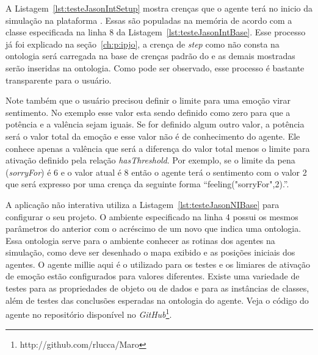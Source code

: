 A Listagem~\ref{lst:testeJasonIntSetup} mostra crenças que o agente terá
no inicio da simulação na plataforma \jason. Essas são populadas na memória
de acordo com a classe especificada na linha 8 da
Listagem~\ref{lst:testeJasonIntBase}. Esse processo já foi explicado na
seção~\ref{ch:p:ipjo}, a crença de \emph{step} como não
consta na ontologia será carregada na base de crenças padrão do \jason e as
demais mostradas serão inseridas na ontologia. Como pode ser observado, esse
processo é bastante transparente para o usuário.

Note também que o usuário precisou definir o limite para uma emoção virar
sentimento. No exemplo esse valor esta sendo definido como zero para que a
potência e a valência sejam iguais. Se for definido algum outro valor, a
potência será o valor total da emoção e esse valor não é de conhecimento do
agente. Ele conhece apenas a valência que será a diferença do valor total
menos o limite para ativação definido pela relação \emph{hasThreshold}. Por
exemplo, se o limite da pena (\emph{sorryFor}) é 6 e o valor atual é 8 então o
agente terá o sentimento com o valor 2 que será expresso por uma crença da
seguinte forma ``feeling("sorryFor",2).''.


\begin{center}
    \begin{minipage}{140mm}
	\lstset{linewidth=140mm}
	
    \end{minipage}
\end{center}

A aplicação não interativa utiliza a Listagem~\ref{lst:testeJasonNIBase} para
configurar o seu projeto. O ambiente especificado na linha 4 possui os mesmos
parâmetros do anterior com o acréscimo de um novo que indica uma ontologia.
Essa ontologia serve para o ambiente conhecer as rotinas dos agentes na
simulação, como deve ser desenhado o mapa exibido e as posições iniciais dos
agentes. O agente millie aqui é o utilizado para os testes e os limiares de
ativação de emoção estão configurados para valores diferentes. Existe uma
variedade de testes para as propriedades de objeto ou de dados e para as
instâncias de classes, além de testes das conclusões esperadas na ontologia do
agente. Veja o código do agente no repositório disponível no
\emph{GitHub}\footnote{http://github.com/rlucca/Maro}.

